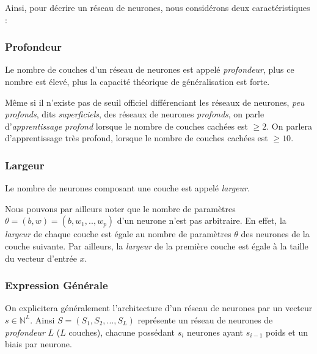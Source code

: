 \documentclass[a4paper, 11pt]{report}
\begin{document}
Ainsi, pour décrire un réseau de neurones, nous considérons deux caractéristiques :
\subsubsection{Profondeur}
\begin{center}
	Le nombre de couches d'un réseau de neurones est appelé \emph{profondeur}, plus ce nombre est élevé, plus la capacité théorique de généralisation est forte.
\end{center}
Même si il n'existe pas de seuil officiel différenciant les réseaux de neurones, \emph{peu profonds}, dits \emph{superficiels}, des réseaux de neurones \emph{profonds}, on parle d'\emph{apprentissage profond} lorsque le nombre de couches cachées est $\geq 2$.
On parlera d'apprentissage très profond, lorsque le nombre de couches cachées est $\geq 10$.
\subsubsection{Largeur}
\begin{center}
	Le nombre de neurones composant une couche est appelé \emph{largeur}.
	\end{center}
Nous pouvons par ailleurs noter que le nombre de paramètres $\theta = (b,w) = (b,w_1,..,w_p)$ d'un neurone n'est pas arbitraire.
En effet, la \emph{largeur} de chaque couche est égale au nombre de paramètres $\theta$ des neurones de la couche suivante.
Par ailleurs, la \emph{largeur} de la première couche est égale à la taille du vecteur d'entrée $x$.
\subsubsection{Expression Générale}
On explicitera généralement l'architecture d'un réseau de neurones par un vecteur $s \in \mathbb{N}^L$.
Ainsi $S = (S_1, S_2, ..., S_L)$ représente un réseau de neurones de \emph{profondeur} $L$ ($L$ couches), chacune possédant $s_i$ neurones ayant $s_{i-1}$ poids et un biais par neurone.
\end{document}

